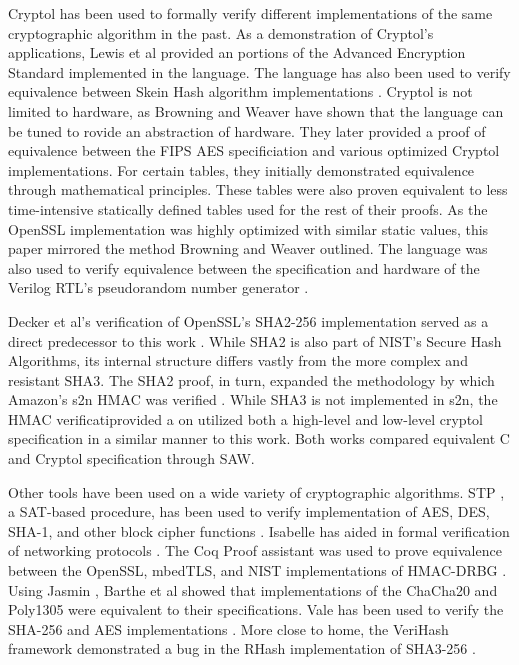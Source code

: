 Cryptol has been used to formally verify different implementations of the same cryptographic algorithm in the past.
As a demonstration of Cryptol's applications, Lewis et al \cite{crypt-hi} provided an portions of the Advanced Encryption Standard implemented in the language.
The language has also been used to verify equivalence between Skein Hash algorithm implementations \cite{hard-soft}.
Cryptol is not limited to hardware, as Browning and Weaver \cite{design-verif} have shown that the language can be tuned to rovide an abstraction of hardware.
They later provided a proof of equivalence between the FIPS AES specificiation and various optimized Cryptol implementations.
For certain tables, they initially demonstrated equivalence through mathematical principles.
These tables were also proven equivalent to less time-intensive statically defined tables used for the rest of their proofs.
As the OpenSSL implementation was highly optimized with similar static values, this paper mirrored the method Browning and Weaver outlined.
The language was also used to verify equivalence between the specification and hardware of the Verilog RTL's pseudorandom number generator \cite{pseudorandom}.

Decker et al's verification of OpenSSL's SHA2-256 implementation served as a direct predecessor to this work \cite{nfm-us}.
While SHA2 is also part of NIST's Secure Hash Algorithms, its internal structure differs vastly from the more complex and resistant SHA3.
The SHA2 proof, in turn, expanded the methodology by which Amazon's s2n HMAC was verified \cite{s2n-blog}.
While SHA3 is not implemented in s2n, the HMAC verificatiprovided a on utilized both a high-level and low-level cryptol specification in a similar manner to this work.
Both works compared equivalent C and Cryptol specification through SAW.

Other tools have been used on a wide variety of cryptographic algorithms.
STP \cite{stp}, a SAT-based procedure, has been used to verify implementation of AES, DES, SHA-1, and other block cipher functions \cite{auto}.
Isabelle \cite{isabelle} has aided in formal verification of networking protocols \cite{formal-protocols}.
The Coq \cite{coq} Proof assistant was used to prove equivalence between the OpenSSL, mbedTLS, and NIST implementations of HMAC-DRBG \cite{verified-correctness}.
Using Jasmin \cite{jasmin}, Barthe et al \cite{hi-assurance} showed that implementations of the ChaCha20 and Poly1305 were equivalent to their specifications.
Vale has been used to verify the SHA-256 and AES implementations \cite{vale}.
More close to home, the VeriHash framework demonstrated a bug in the RHash \cite{rhash} implementation of SHA3-256 \cite{hash-functions}.
